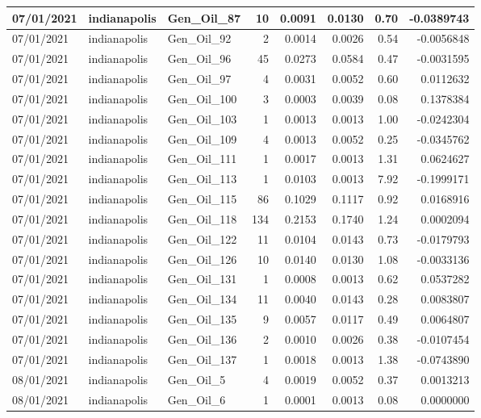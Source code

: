\documentclass[
  letterpaper,
  DIV=11,
  numbers=noendperiod]{scrartcl}
\begin{document}
\begin{tabular}{l|l|l|r|r|r|r|r}
\hline
07/01/2021 & indianapolis & Gen\_Oil\_87 & 10 & 0.0091 & 0.0130 & 0.70 & -0.0389743\\
\hline
07/01/2021 & indianapolis & Gen\_Oil\_92 & 2 & 0.0014 & 0.0026 & 0.54 & -0.0056848\\
\hline
07/01/2021 & indianapolis & Gen\_Oil\_96 & 45 & 0.0273 & 0.0584 & 0.47 & -0.0031595\\
\hline
07/01/2021 & indianapolis & Gen\_Oil\_97 & 4 & 0.0031 & 0.0052 & 0.60 & 0.0112632\\
\hline
07/01/2021 & indianapolis & Gen\_Oil\_100 & 3 & 0.0003 & 0.0039 & 0.08 & 0.1378384\\
\hline
07/01/2021 & indianapolis & Gen\_Oil\_103 & 1 & 0.0013 & 0.0013 & 1.00 & -0.0242304\\
\hline
07/01/2021 & indianapolis & Gen\_Oil\_109 & 4 & 0.0013 & 0.0052 & 0.25 & -0.0345762\\
\hline
07/01/2021 & indianapolis & Gen\_Oil\_111 & 1 & 0.0017 & 0.0013 & 1.31 & 0.0624627\\
\hline
07/01/2021 & indianapolis & Gen\_Oil\_113 & 1 & 0.0103 & 0.0013 & 7.92 & -0.1999171\\
\hline
07/01/2021 & indianapolis & Gen\_Oil\_115 & 86 & 0.1029 & 0.1117 & 0.92 & 0.0168916\\
\hline
07/01/2021 & indianapolis & Gen\_Oil\_118 & 134 & 0.2153 & 0.1740 & 1.24 & 0.0002094\\
\hline
07/01/2021 & indianapolis & Gen\_Oil\_122 & 11 & 0.0104 & 0.0143 & 0.73 & -0.0179793\\
\hline
07/01/2021 & indianapolis & Gen\_Oil\_126 & 10 & 0.0140 & 0.0130 & 1.08 & -0.0033136\\
\hline
07/01/2021 & indianapolis & Gen\_Oil\_131 & 1 & 0.0008 & 0.0013 & 0.62 & 0.0537282\\
\hline
07/01/2021 & indianapolis & Gen\_Oil\_134 & 11 & 0.0040 & 0.0143 & 0.28 & 0.0083807\\
\hline
07/01/2021 & indianapolis & Gen\_Oil\_135 & 9 & 0.0057 & 0.0117 & 0.49 & 0.0064807\\
\hline
07/01/2021 & indianapolis & Gen\_Oil\_136 & 2 & 0.0010 & 0.0026 & 0.38 & -0.0107454\\
\hline
07/01/2021 & indianapolis & Gen\_Oil\_137 & 1 & 0.0018 & 0.0013 & 1.38 & -0.0743890\\
\hline
08/01/2021 & indianapolis & Gen\_Oil\_5 & 4 & 0.0019 & 0.0052 & 0.37 & 0.0013213\\
\hline
08/01/2021 & indianapolis & Gen\_Oil\_6 & 1 & 0.0001 & 0.0013 & 0.08 & 0.0000000\\

\end{tabular}
\end{document}
